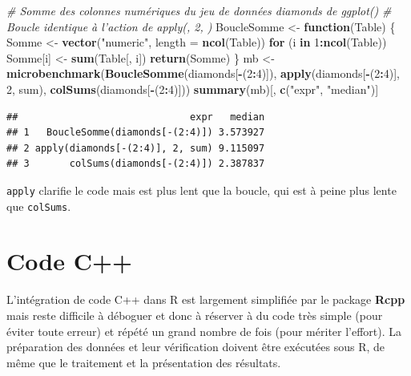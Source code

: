 \documentclass[
  12pt,
  french,
  a4paper,
  extrafontsizes,onecolumn,openright
  ]{memoir}
\newenvironment{Shaded}{\begin{snugshade}}{\end{snugshade}}
\newcommand{\CommentTok}[1]{\textcolor[rgb]{0.56,0.35,0.01}{\textit{#1}}}
\newcommand{\ControlFlowTok}[1]{\textcolor[rgb]{0.13,0.29,0.53}{\textbf{#1}}}
\newcommand{\DataTypeTok}[1]{\textcolor[rgb]{0.13,0.29,0.53}{#1}}
\newcommand{\DecValTok}[1]{\textcolor[rgb]{0.00,0.00,0.81}{#1}}
\newcommand{\KeywordTok}[1]{\textcolor[rgb]{0.13,0.29,0.53}{\textbf{#1}}}
\newcommand{\NormalTok}[1]{#1}
\newcommand{\OperatorTok}[1]{\textcolor[rgb]{0.81,0.36,0.00}{\textbf{#1}}}
\newcommand{\StringTok}[1]{\textcolor[rgb]{0.31,0.60,0.02}{#1}}
\begin{document}
\begin{Shaded}
\begin{Highlighting}[]
\CommentTok{# Somme des colonnes numériques du jeu de données diamonds de ggplot()}
\CommentTok{# Boucle identique à l'action de apply(, 2, )}
\NormalTok{BoucleSomme <-}\StringTok{ }\ControlFlowTok{function}\NormalTok{(Table) \{}
\NormalTok{  Somme <-}\StringTok{ }\KeywordTok{vector}\NormalTok{(}\StringTok{"numeric"}\NormalTok{, }\DataTypeTok{length =} \KeywordTok{ncol}\NormalTok{(Table))}
  \ControlFlowTok{for}\NormalTok{ (i }\ControlFlowTok{in} \DecValTok{1}\OperatorTok{:}\KeywordTok{ncol}\NormalTok{(Table)) Somme[i] <-}\StringTok{ }\KeywordTok{sum}\NormalTok{(Table[, i])}
  \KeywordTok{return}\NormalTok{(Somme)}
\NormalTok{\}}
\NormalTok{mb <-}\StringTok{ }\KeywordTok{microbenchmark}\NormalTok{(}\KeywordTok{BoucleSomme}\NormalTok{(diamonds[}\OperatorTok{-}\NormalTok{(}\DecValTok{2}\OperatorTok{:}\DecValTok{4}\NormalTok{)]), }
                     \KeywordTok{apply}\NormalTok{(diamonds[}\OperatorTok{-}\NormalTok{(}\DecValTok{2}\OperatorTok{:}\DecValTok{4}\NormalTok{)], }\DecValTok{2}\NormalTok{, sum), }
                     \KeywordTok{colSums}\NormalTok{(diamonds[}\OperatorTok{-}\NormalTok{(}\DecValTok{2}\OperatorTok{:}\DecValTok{4}\NormalTok{)]))}
\KeywordTok{summary}\NormalTok{(mb)[, }\KeywordTok{c}\NormalTok{(}\StringTok{"expr"}\NormalTok{, }\StringTok{"median"}\NormalTok{)]}
\end{Highlighting}
\end{Shaded}

\begin{verbatim}
##                              expr   median
## 1   BoucleSomme(diamonds[-(2:4)]) 3.573927
## 2 apply(diamonds[-(2:4)], 2, sum) 9.115097
## 3       colSums(diamonds[-(2:4)]) 2.387837
\end{verbatim}

\normalsize

\texttt{apply} clarifie le code mais est plus lent que la boucle, qui est à peine plus lente que \texttt{colSums}.

\hypertarget{sec:cpp}{%
\section{Code C++}\label{sec:cpp}}

L'intégration de code C++ dans R est largement simplifiée par le package \textbf{Rcpp} mais reste difficile à déboguer et donc à réserver à du code très simple (pour éviter toute erreur) et répété un grand nombre de fois (pour mériter l'effort).
La préparation des données et leur vérification doivent être exécutées sous R, de même que le traitement et la présentation des résultats.
\end{document}
